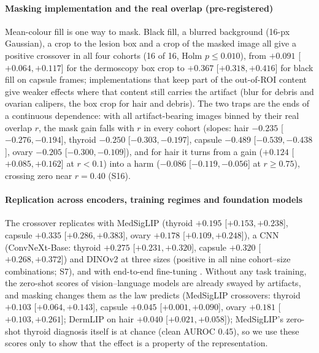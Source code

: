 \paragraph{Masking implementation and the real overlap (pre-registered)} Mean-colour fill is one way to mask. Black fill, a blurred background (16-px Gaussian), a crop to the lesion box and a
crop of the masked image all give a positive crossover in all four cohorts (16 of 16, Holm $p\le0.010$), from
$+0.091$ [$+0.064, +0.117$] for the dermoscopy box crop to $+0.367$ [$+0.318, +0.416$] for black fill on capsule
frames; implementations that keep part of the out-of-ROI content give weaker effects where that content still carries
the artifact (blur for debris and ovarian calipers, the box crop for hair and debris). The two traps are the ends of a
continuous dependence: with all artifact-bearing images binned by their real overlap $r$, the mask gain falls with $r$ in
every cohort (slopes: hair $-0.235$ [$-0.276, -0.194$], thyroid $-0.250$ [$-0.303, -0.197$], capsule $-0.489$
[$-0.539, -0.438$], ovary $-0.205$ [$-0.300, -0.109$]), and for hair it turns from a gain ($+0.124$ [$+0.085, +0.162$]
at $r<0.1$) into a harm ($-0.086$ [$-0.119, -0.056$] at $r\ge0.75$), crossing zero near $r=0.40$ (S16).

\paragraph{Replication across encoders, training regimes and foundation models} The crossover replicates with MedSigLIP (thyroid $+0.195$ [$+0.153, +0.238$], capsule $+0.335$ [$+0.286, +0.383$],
ovary $+0.178$ [$+0.109, +0.248$]), a CNN (ConvNeXt-Base: thyroid $+0.275$ [$+0.231, +0.320$], capsule $+0.320$ [$+0.268, +0.372$]) and
DINOv2 at three sizes (positive in all nine cohort--size combinations; S7), and with end-to-end fine-tuning .
Without any task training, the zero-shot scores of vision--language models are already swayed by artifacts, and
masking changes them as the law predicts (MedSigLIP crossovers: thyroid $+0.103$ [$+0.064, +0.143$], capsule $+0.045$
[$+0.001, +0.090$], ovary $+0.181$ [$+0.103, +0.261$]; DermLIP on hair $+0.040$ [$+0.021, +0.058$]); MedSigLIP's
zero-shot thyroid diagnosis itself is at chance (clean AUROC 0.45), so we use these scores only to show that the
effect is a property of the representation.

